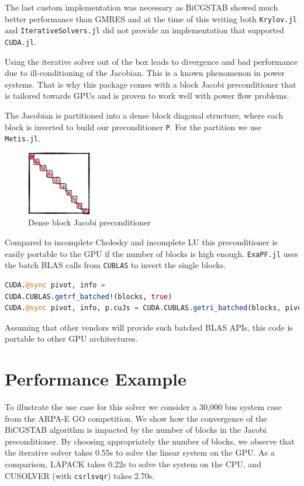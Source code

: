 \documentclass{juliacon}
\begin{document}
The last custom implementation was necessary as BiCGSTAB showed much better
performance than GMRES and at the time of this writing both \lstinline{Krylov.jl} and
\lstinline{IterativeSolvers.jl} did not provide an implementation that supported
\lstinline{CUDA.jl}.

Using the iterative solver out of the box leads to divergence and bad performance due to
ill-conditioning of the Jacobian. This is a known phenomenon in power
systems. That is why this package comes with a block Jacobi preconditioner
that is tailored towards GPUs and is proven to work well with power flow
problems.

The Jacobian is partitioned into a dense block diagonal structure, where each block is inverted to build our preconditioner \lstinline{P}. For the partition we use \lstinline{Metis.jl}.

\begin{figure}
    \centering
    \includegraphics[width=0.25\textwidth]{figures/gpublocks.png}
    \caption{Dense block Jacobi preconditioner}
    \label{fig:preconditioner}
\end{figure}

Compared to incomplete Cholesky and incomplete LU this preconditioner is easily portable to the GPU if the number of blocks is high enough. \lstinline{ExaPF.jl} uses the batch BLAS calls from \lstinline{CUBLAS} to invert the single blocks.

\begin{lstlisting}[language = Julia]
CUDA.@sync pivot, info = 
CUDA.CUBLAS.getrf_batched!(blocks, true)
CUDA.@sync pivot, info, p.cuJs = CUDA.CUBLAS.getri_batched(blocks, pivot)
\end{lstlisting}

Assuming that other vendors will provide such batched BLAS APIs, this code is portable to other GPU architectures.

\section{Performance Example}

To illustrate the use case for this solver we consider a 30,000 bus system case from the ARPA-E GO competition.
We show how the convergence of the BiCGSTAB algorithm is impacted by the number of blocks in the Jacobi preconditioner.
By choosing appropriately the number of blocks, we observe that the iterative solver
takes 0.55s to solve the linear system on the GPU. As a comparison,
LAPACK takes 0.22s to solve the system on the CPU, and CUSOLVER (with \lstinline{csrlsvqr})
takes 2.70s.
\end{document}
